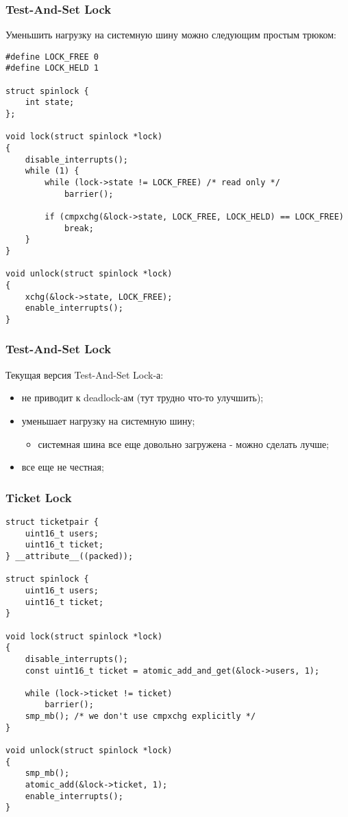 \begin{frame}[fragile]
\frametitle{Test-And-Set Lock}

Уменьшить нагрузку на системную шину можно следующим простым трюком:

\begin{lstlisting}
#define LOCK_FREE 0
#define LOCK_HELD 1

struct spinlock {
    int state;
};

void lock(struct spinlock *lock)
{
    disable_interrupts();
    while (1) {
        while (lock->state != LOCK_FREE) /* read only */
            barrier();

        if (cmpxchg(&lock->state, LOCK_FREE, LOCK_HELD) == LOCK_FREE)
            break;
    }
}

void unlock(struct spinlock *lock)
{
    xchg(&lock->state, LOCK_FREE);
    enable_interrupts();
}
\end{lstlisting}
\end{frame}

\begin{frame}
\frametitle{Test-And-Set Lock}

Текущая версия Test-And-Set Lock-а:
\begin{itemize}
  \item не приводит к deadlock-ам (тут трудно что-то улучшить);
  \item уменьшает нагрузку на системную шину;
        \begin{itemize}
          \item системная шина все еще довольно загружена - можно сделать лучше;
        \end{itemize}
  \item все еще не честная;
\end{itemize}
\end{frame}

\begin{frame}[fragile]
\frametitle{Ticket Lock}

\begin{lstlisting}
struct ticketpair {
    uint16_t users;
    uint16_t ticket;
} __attribute__((packed));

struct spinlock {
    uint16_t users;
    uint16_t ticket;
}

void lock(struct spinlock *lock)
{
    disable_interrupts();
    const uint16_t ticket = atomic_add_and_get(&lock->users, 1);

    while (lock->ticket != ticket)
        barrier();
    smp_mb(); /* we don't use cmpxchg explicitly */
}

void unlock(struct spinlock *lock)
{
    smp_mb();
    atomic_add(&lock->ticket, 1);
    enable_interrupts();
}
\end{lstlisting}
\end{frame}

